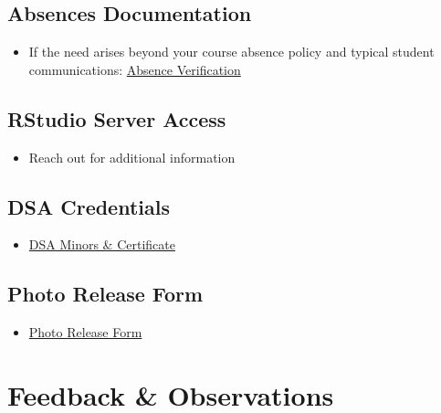 \documentclass[
  letterpaper,
  DIV=11,
  numbers=noendperiod]{scrreprt}
\providecommand{\tightlist}{%
  \setlength{\itemsep}{0pt}\setlength{\parskip}{0pt}}
\begin{document}
\section{Absences Documentation}\label{absences-documentation}

\begin{itemize}
\tightlist
\item
  If the need arises beyond your course absence policy and typical
  student communications:
  \href{https://dasa.ncsu.edu/support-and-advocacy/find-help/absence-notification/}{Absence
  Verification}
\end{itemize}

\section{RStudio Server Access}\label{rstudio-server-access}

\begin{itemize}
\tightlist
\item
  Reach out for additional information
\end{itemize}

\section{DSA Credentials}\label{dsa-credentials}

\begin{itemize}
\tightlist
\item
  \href{https://datascienceacademy.ncsu.edu/courses/dsa-minors-and-certificates/}{DSA
  Minors \& Certificate}
\end{itemize}

\section{Photo Release Form}\label{photo-release-form}

\begin{itemize}
\tightlist
\item
  \href{https://brand.ncsu.edu/assets/photo-release-form.pdf}{Photo
  Release Form}
\end{itemize}


\chapter{Feedback \& Observations}\label{feedback-observations}
\end{document}
